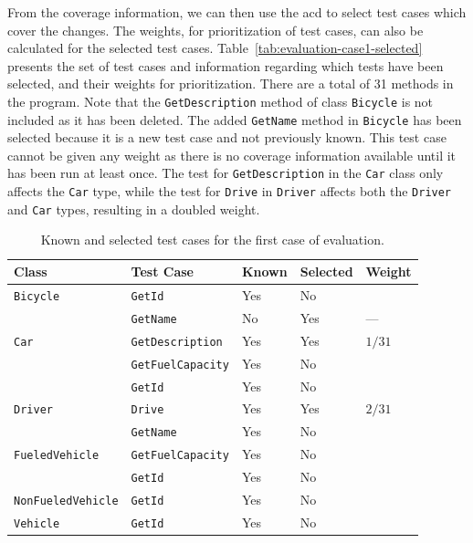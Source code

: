 \documentclass[a4paper,english,12pt]{report}
\newcommand{\textcf}{\texttt}
\begin{document}
From the coverage information, we can then use the \gls{acd} to select test cases which cover the changes. The weights, for prioritization of test cases, can also be calculated for the selected test cases. Table~\vref{tab:evaluation-case1-selected} presents the set of test cases and information regarding which tests have been selected, and their weights for prioritization. There are a total of 31 methods in the program. Note that the \textcf{GetDescription} method of class \textcf{Bicycle} is not included as it has been deleted. The added \textcf{GetName} method in \textcf{Bicycle} has been selected because it is a new test case and not previously known. This test case cannot be given any weight as there is no coverage information available until it has been run at least once. The test for \textcf{GetDescription} in the \textcf{Car} class only affects the \textcf{Car} type, while the test for \textcf{Drive} in \textcf{Driver} affects both the \textcf{Driver} and \textcf{Car} types, resulting in a doubled weight.

\begin{table}[htbp]
  \centering
  \begin{tabular}{|l|l|l|l|l|}
    \hline
    \textbf{Class} & \textbf{Test Case} & \textbf{Known} & \textbf{Selected} & \textbf{Weight}\\
    \hline
    \textcf{Bicycle} & \textcf{GetId} & Yes & No &\\
            & \textcf{GetName} & No & Yes & ---\\
    \hline
    \textcf{Car} & \textcf{GetDescription} & Yes & Yes & $1/31$\\
        & \textcf{GetFuelCapacity} & Yes & No &\\
        & \textcf{GetId} & Yes & No &\\
    \hline
    \textcf{Driver} & \textcf{Drive} & Yes & Yes & $2/31$\\
           & \textcf{GetName} & Yes & No &\\
    \hline
    \textcf{FueledVehicle} & \textcf{GetFuelCapacity} & Yes & No &\\
                  & \textcf{GetId} & Yes & No &\\
    \hline
    \textcf{NonFueledVehicle} & \textcf{GetId} & Yes & No &\\
    \hline
    \textcf{Vehicle} & \textcf{GetId} & Yes & No &\\
    \hline
  \end{tabular}
  \caption{Known and selected test cases for the first case of evaluation.}
  \label{tab:evaluation-case1-selected}
\end{table}
\end{document}
